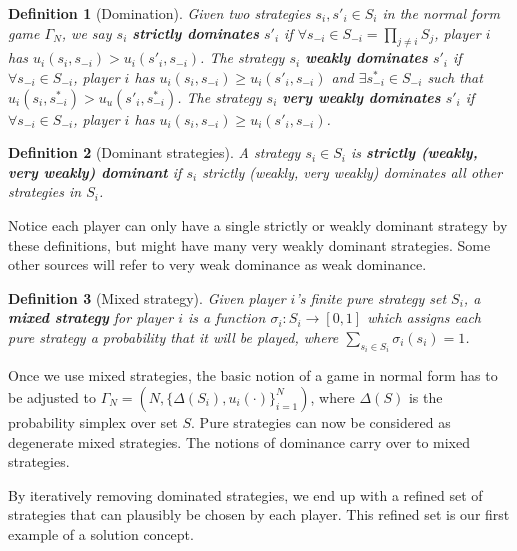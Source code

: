 \documentclass[letter, 11pt]{article}
\theoremstyle{basic}
\newtheorem{definition}{Definition}[section]
\newcommand{\noti}{{{\scriptscriptstyle-}\!i}}
\begin{document}
\begin{spacing}{1.0}
\begin{definition}[Domination]
  Given two strategies $s_i, s'_i \in S_i$ in the
  normal form game $\Gamma_N$, we say $s_i$ \textbf{strictly dominates}
  $s'_i$ if $\forall s_\noti \in S_\noti = \prod_{j\neq i} S_j$, player $i$ has
  $u_i(s_i,s_\noti) > u_i(s'_i, s_\noti)$. The strategy $s_i$ \textbf{weakly
    dominates} $s'_i$ if $\forall s_\noti \in S_\noti$,
  player $i$ has $u_i(s_i,s_\noti) \ge u_i(s'_i, s_\noti)$ and $\exists
  s^*_\noti \in S_\noti$ such that $u_i(s_i, s^*_\noti) > u_u(s'_i,
  s^*_\noti)$. The strategy $s_i$ \textbf{very weakly
    dominates} $s'_i$ if $\forall s_\noti \in S_\noti$,
  player $i$ has $u_i(s_i,s_\noti) \ge u_i(s'_i, s_\noti)$.
\end{definition}

\begin{definition}[Dominant strategies]
  A strategy $s_i \in S_i$ is \textbf{strictly (weakly, very weakly)
    dominant} if $s_i$ strictly (weakly, very weakly) dominates all other
  strategies in $S_i$.
\end{definition}

Notice each player can only have a single strictly or weakly dominant
strategy by these definitions, but might have many very weakly dominant
strategies. Some other sources will refer to very weak dominance as weak dominance.

\begin{definition}[Mixed strategy]
  Given player $i$'s finite pure
  strategy set $S_i$, a \textbf{mixed strategy} for player $i$ is
  a function $\sigma_i : S_i \to [0,1]$ which assigns
  each pure strategy a probability that it will be
  played, where $\sum_{s_i\in S_i} \sigma_i(s_i) = 1$.
\end{definition}

Once we use mixed strategies, the basic notion of a game in normal form has
to be adjusted to $\Gamma_N = \left(N, \{\Delta(S_i),
  u_i(\cdot)\}_{i=1}^N\right)$, where $\Delta(S)$ is the probability
simplex over set $S$. Pure strategies can now be considered as degenerate
mixed strategies. The notions of dominance carry over to mixed
strategies.

\hspace{1em}
By iteratively removing dominated strategies, we end up with a refined set
of strategies that can plausibly be chosen by each player. This refined set
is our first example of a solution concept.


\end{spacing}
\end{document}
